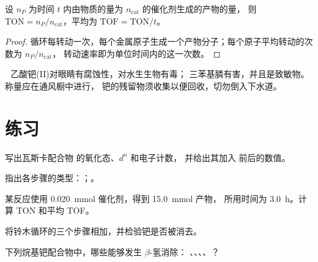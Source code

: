 \begin{proposition}[转化数]\label{prop:b2:catalytic-cycles:tof}
设 $n_P$ 为时间 $t$ 内由物质的量为 $n_{\text{cat}}$ 的催化剂生成的产物的量，
则 $\mathrm{TON} = n_P/n_{\text{cat}}$，平均为 $\mathrm{TOF} =
\mathrm{TON}/t$。
\end{proposition}

\begin{proof}
循环每转动一次，每个金属原子生成一个产物分子；每个原子平均转动的次数为
$n_P/n_{\text{cat}}$，
转动速率即为单位时间内的这一次数。
\end{proof}

\begin{safety}{\,\,}
乙酸钯(II)对眼睛有腐蚀性，对水生生物有毒；
三苯基膦有害，并且是致敏物。称量应在通风橱中进行，
钯的残留物须收集以便回收，切勿倒入下水道。
\end{safety}

\section{练习}

\begin{exercise}[$\star$]\label{exo:b2:catalytic-cycles:1}
写出瓦斯卡配合物  的氧化态、$d^n$ 和电子计数，
并给出其加入  前后的数值。
\end{exercise}

\begin{exercise}[$\star$]\label{exo:b2:catalytic-cycles:2}
指出各步骤的类型：；。
\end{exercise}

\begin{exercise}[$\star$]\label{exo:b2:catalytic-cycles:3}
某反应使用 \qty{0.020}{mmol} 催化剂，得到 \qty{15.0}{mmol} 产物，
所用时间为 \qty{3.0}{h}。计算 TON 和平均 TOF。
\end{exercise}

\begin{exercise}[$\star$]\label{exo:b2:catalytic-cycles:4}
将铃木循环的三个步骤相加，并检验钯是否被消去。
\end{exercise}

\begin{exercise}[$\star\star$]\label{exo:b2:catalytic-cycles:5}
下列烷基钯配合物中，哪些能够发生 $\beta$-氢消除：
、、、、？
\end{exercise}

